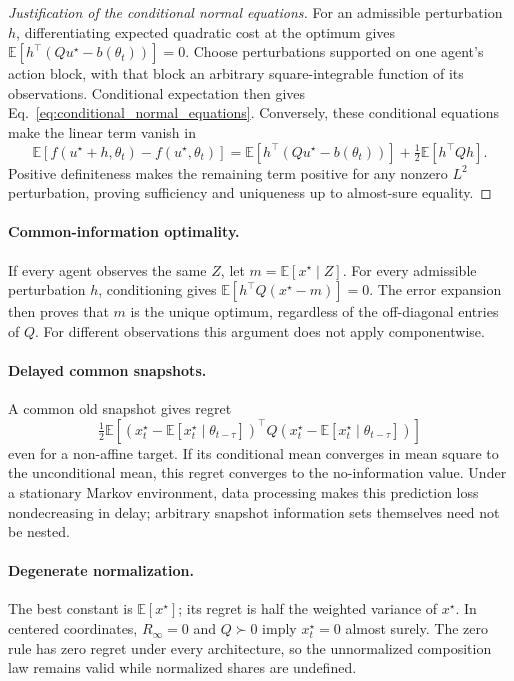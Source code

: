 \begin{proof}[Justification of the conditional normal equations]
For an admissible perturbation $h$, differentiating expected quadratic cost
at the optimum gives $\mathbb E[h^\top(Qu^\star-b(\theta_t))]=0$.
Choose perturbations supported on one agent's action block, with that block
an arbitrary square-integrable function of its observations. Conditional
expectation then gives Eq.~\eqref{eq:conditional_normal_equations}.
Conversely, these conditional equations make the linear term vanish in
\[
\mathbb E[f(u^\star+h,\theta_t)-f(u^\star,\theta_t)]
=\mathbb E[h^\top(Qu^\star-b(\theta_t))]+\tfrac12\mathbb E[h^\top Qh].
\]
Positive definiteness makes the remaining term positive for any nonzero
$L^2$ perturbation, proving sufficiency and uniqueness up to almost-sure equality.
\end{proof}

\paragraph{Common-information optimality.}
If every agent observes the same $Z$, let $m=\mathbb E[x^\star\mid Z]$.
For every admissible perturbation $h$, conditioning gives
$\mathbb E[h^\top Q(x^\star-m)]=0$. The error expansion then proves that
$m$ is the unique optimum, regardless of the off-diagonal entries of $Q$.
For different observations this argument does not apply componentwise.
\paragraph{Delayed common snapshots.}
A common old snapshot gives regret
\[
\tfrac12\mathbb E[(x_t^\star-\mathbb E[x_t^\star\mid\theta_{t-\tau}])^\top
Q(x_t^\star-\mathbb E[x_t^\star\mid\theta_{t-\tau}])]
\]
even for a non-affine target. If its conditional mean converges in mean square to the unconditional
mean, this regret converges to the no-information value. Under a stationary
Markov environment, data processing makes this prediction loss nondecreasing
in delay; arbitrary snapshot information sets themselves need not be nested.
\paragraph{Degenerate normalization.}
The best constant is $\mathbb E[x^\star]$; its regret is half the weighted
variance of $x^\star$. In centered coordinates, $R_\infty=0$ and $Q\succ0$
imply $x_t^\star=0$ almost surely. The zero rule has zero regret under
every architecture, so the unnormalized composition law remains valid
while normalized shares are undefined.


